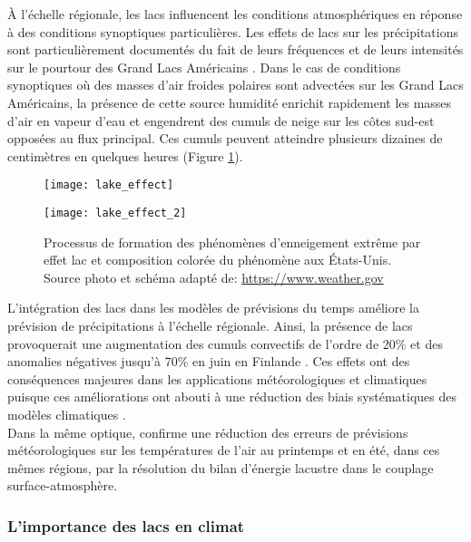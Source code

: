 À l'échelle régionale, les lacs influencent les conditions atmosphériques en réponse à des conditions synoptiques particulières. Les effets de lacs sur les précipitations sont particulièrement documentés du fait de leurs fréquences et de leurs intensités sur le pourtour des Grand Lacs Américains \citep{niziol1995}. Dans le cas de conditions synoptiques où des masses d'air froides polaires sont advectées sur les Grand Lacs Américains, la présence de cette source humidité enrichit rapidement les masses d'air en vapeur d'eau et engendrent des cumuls de neige sur les côtes sud-est opposées au flux principal. Ces cumuls peuvent atteindre plusieurs dizaines de centimètres en quelques heures (Figure \ref{lake-effect-2}).
~\\

\begin{figure}[h!]
    \begin{minipage}[c]{.45\linewidth}
        \centering
        \texttt{[image: lake\_effect]}       
    \end{minipage}
    \hfill%
    \begin{minipage}[c]{.45\linewidth}
        \centering
        \texttt{[image: lake\_effect\_2]}
    \end{minipage}
  \caption{Processus de formation des phénomènes d'enneigement extrême par effet lac et composition colorée du phénomène aux États-Unis. Source photo et schéma adapté de: \url{https://www.weather.gov}}
   \label{lake-effect-2}
\end{figure}

L'intégration des lacs dans les modèles de prévisions du temps améliore la prévision de précipitations à l'échelle régionale. Ainsi, la présence de lacs provoquerait une augmentation des cumuls convectifs de l'ordre de 20\% et des anomalies négatives jusqu'à 70\% en juin en Finlande \citep{samuelsson2010}. Ces effets ont des conséquences majeures dans les applications météorologiques et climatiques puisque ces améliorations ont abouti à une réduction des biais systématiques des modèles climatiques \citep{lemoigne2016}. \\
Dans la même optique, \citet{balsamo2012} confirme une réduction des erreurs de prévisions météorologiques sur les températures de l'air au printemps et en été, dans ces mêmes régions, par la résolution du bilan d'énergie lacustre dans le couplage surface-atmosphère.

\subsubsection{{\selectfont L'importance des lacs en climat}}

